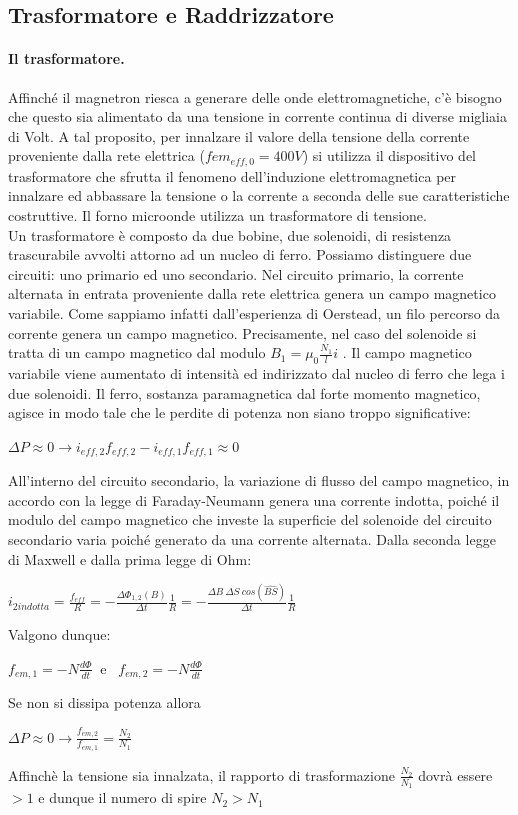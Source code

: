 \documentclass{article}
\begin{document}
\subsection{Trasformatore e Raddrizzatore  }
\paragraph{Il trasformatore.}
Affinché il magnetron riesca a generare delle onde elettromagnetiche, c'è bisogno che questo sia alimentato da una tensione in corrente continua di diverse migliaia di Volt.
A tal proposito, per innalzare il valore della tensione della corrente proveniente dalla rete elettrica ($fem_{eff,0} = 400V$) si utilizza il dispositivo del trasformatore che sfrutta il fenomeno dell'induzione elettromagnetica per innalzare ed abbassare la tensione o la corrente a seconda delle sue caratteristiche costruttive. Il forno microonde utilizza un trasformatore di tensione.
\\

Un trasformatore è composto da due bobine, due solenoidi, di resistenza trascurabile avvolti attorno ad un nucleo di ferro. Possiamo distinguere due circuiti: uno primario ed uno secondario.
Nel circuito primario, la corrente alternata in entrata proveniente dalla rete elettrica genera un campo magnetico variabile. Come sappiamo infatti dall'esperienza di Oerstead, un filo percorso da corrente genera un campo magnetico. Precisamente, nel caso del solenoide si tratta di un campo magnetico dal modulo $ B_1 = \mu_0 \frac{N_1}{l}i $ . Il campo magnetico variabile viene aumentato di intensità ed indirizzato dal nucleo di ferro che lega i due solenoidi. Il ferro, sostanza paramagnetica dal forte momento magnetico, agisce in modo tale che le perdite di potenza non siano troppo significative: 
\begin{center}
$\Delta P \approx 0  \to  i_{eff,2}f_{eff,2}- i_{eff,1}f_{eff,1} \approx  0$ 
\end{center}

All'interno del circuito secondario, la variazione di flusso del campo magnetico, in accordo con la legge di Faraday-Neumann genera una corrente indotta, poiché il modulo del campo magnetico che investe la superficie del solenoide del circuito secondario varia poiché generato da una corrente alternata. Dalla seconda legge di Maxwell e dalla prima legge di Ohm: 
\begin{center}
 $i_{2 indotta} = \frac{f_{eff}}{R} = -\frac{\Delta\Phi_{1,2}(B)}{\Delta t} \frac{1}{R} = -\frac{\Delta B \ \Delta S \ cos(\widehat{BS})}{\Delta t}\frac{1}{R}$ 
\end{center}
Valgono dunque: 
\begin{center}
$f_{em,1} = -N \frac{d\Phi}{dt} \ $ e \  $f_{em,2} = -N \frac{d\Phi}{dt}$   
\end{center}
Se non si dissipa potenza allora 
\begin{center}
$\Delta P \approx 0  \to \frac{f_{em,2}}{f_{em,1} } = \frac{N_2 }{N_1}$
\end{center}
Affinchè la tensione sia innalzata, il rapporto di 
trasformazione $\frac{N_2 }{N_1}$ dovrà essere $>1$ e dunque il numero di spire $N_2 > N_1$
\end{document}
